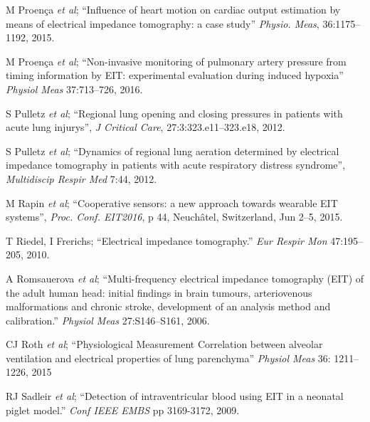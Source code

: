 \documentclass[12pt]{article} \usepackage[margin=3cm]{geometry} \usepackage[margin=20pt,font=small,labelfont=bf]{caption}\def\TBLWIDA{35mm}\def\TBLWIDB{95mm}
\newcommand{\ifmaxthree}[2]{#2 {\em et al}; }
\begin{document}
\begin{thebibliography}{00}
\ifmaxthree{
M Proença, F Braun, M Rapin, J Solà, A Adler, B Grychtol, S Böhm, M Lemay, J-P Thiran,
}{
M Proença
}
``Influence of heart motion on cardiac output estimation by means of electrical impedance tomography: a case study''
{\em Physio. Meas}, 36:1175--1192, 2015.

\ifmaxthree{
M Proença, F Braun, J Solà, A Adler,
M Lemay, J-P Thiran, SF Rimoldi
}{
M Proença
}
``Non-invasive monitoring of pulmonary artery pressure from timing information by EIT: experimental evaluation during induced hypoxia''
{\em Physiol Meas} 37:713--726, 2016.

\ifmaxthree{
S Pulletz, A Adler, M Kott, G Elke, B Gawelczyk, D Schädler, G Zick, N Weiler, I Frerichs
}{
S Pulletz
}
``Regional lung opening and closing pressures in patients with acute lung injurys'',
{\em J Critical Care}, 27:3:323.e11--323.e18, 2012. 

\ifmaxthree{
S Pulletz, M Kott, G Elke, D Schadler, B Vogt, N Weiler, I Frerichs
}{
S Pulletz
}
``Dynamics of
regional lung aeration determined by electrical impedance tomography in patients with acute
respiratory distress syndrome'',
{\em Multidiscip Respir Med} 7:44, 2012.

\ifmaxthree{
M Rapin, M Proença, F Braun, J Solà, O Chételat,
}{
M Rapin
}
``Cooperative sensors: a new approach towards wearable EIT systems'',
{\em Proc. Conf. EIT2016}, p 44, Neuchâtel, Switzerland, Jun 2--5, 2015.

T Riedel, I Frerichs;
``Electrical impedance tomography.''
{\em Eur  Respir  Mon} 47:195--205, 2010.

\ifmaxthree{
A Romsauerova, A McEwan, L Horesh, R Yerworth, RH Bayford, DS Holder
}{
A Romsauerova
}
``Multi-frequency electrical impedance tomography (EIT) of the adult human head: initial findings in brain tumours, arteriovenous malformations and chronic stroke, development of an analysis method and calibration.''
{\em Physiol Meas} 27:S146--S161, 2006. %

\ifmaxthree{
CJ Roth, A Ehrl, T Becher, I Frerichs, JC Schittny, N Weiler, WA Wall, 
}{
CJ Roth
}
``Physiological Measurement
Correlation between alveolar ventilation and 
electrical properties of lung parenchyma''
{\em Physiol Meas} 36: 1211--1226, 2015

\ifmaxthree{
RJ Sadleir, T Tang, AS Tucker, P Borum, M Weiss
}{
RJ Sadleir
}
``Detection of intraventricular blood using EIT in a neonatal piglet model.''
{\em Conf IEEE EMBS} pp 3169-3172, 2009.


\end{thebibliography}
\end{document}
